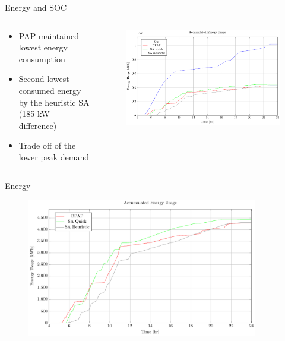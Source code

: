 \documentclass[aspectratio=169]{beamer}
\begin{document}
\begin{frame}[label={sec:org1b876c4}]{Energy and SOC}
\begin{columns}
\begin{column}{0.3\columnwidth}
\begin{itemize}
\item PAP maintained lowest energy consumption
\item Second lowest consumed energy by the heuristic SA (\alert{185} kW difference)
\item Trade off of the lower peak demand
\end{itemize}
\end{column}

\begin{column}{0.7\columnwidth}
\begin{figure}[htpb]
\centering
    \includegraphics[width=\textwidth]{img/sa-pap-paper-good/energy}
\end{figure}
\end{column}
\end{columns}
\end{frame}

\begin{frame}[label={sec:org5b210aa}]{Energy}
\begin{figure}[htpb]
\centering
    \includegraphics[width=0.9\textwidth]{img/sa-pap-paper-good/energy-zoom}
\end{figure}
\end{frame}
\end{document}
